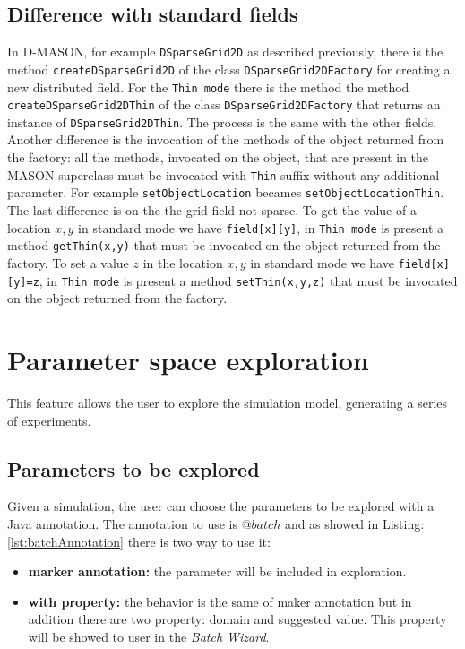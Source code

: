 \documentclass{article}
\begin{document}
\subsection{Difference with standard fields}
In D-MASON, for example \texttt{DSparseGrid2D} as
described previously, there is the method \texttt{createDSparseGrid2D} of the
class \texttt{DSparseGrid2DFactory} for creating a new distributed field. For
the \texttt{Thin mode} there is the method the method
\texttt{createDSparseGrid2DThin} of the class \texttt{DSparseGrid2DFactory}
that returns an instance of \texttt{DSparseGrid2DThin}. The process is the same
with the other fields. Another difference is the invocation of the methods of
the object returned from the factory: all the methods, invocated on the object,
that are present in the MASON superclass must be invocated with \texttt{Thin}
suffix without any additional parameter. For example \texttt{setObjectLocation}
becames \texttt{setObjectLocationThin}. The last difference is on the the grid
field not sparse. To get the value of a location $x,y$ in standard mode we have
\texttt{field[x][y]}, in \texttt{Thin mode} is present a method
\texttt{getThin(x,y)} that must be invocated on the object returned from the
factory. To set a value $z$ in the location $x,y$ in standard mode we have
\texttt{field[x][y]=z}, in \texttt{Thin mode} is present a method
\texttt{setThin(x,y,z)} that must be invocated on the object returned from the
factory.

\newpage
\section{Parameter space exploration}
This feature allows the user to explore the simulation model, generating a series of experiments.

\subsection{Parameters to be explored}
Given a simulation, the user can choose the parameters to be explored with a Java annotation. 
The annotation to use is $@batch$ and as showed in Listing: \ref{lst:batchAnnotation} there is two way
to use it:
\begin{itemize}
  \item \textbf{marker annotation:} the parameter will be included in exploration.
  \item \textbf{with property:} the behavior is the same of maker annotation but in addition there are two property:
  domain and suggested value. This property will be showed to user in the \textit{Batch Wizard}.
\end{itemize}
\end{document}
